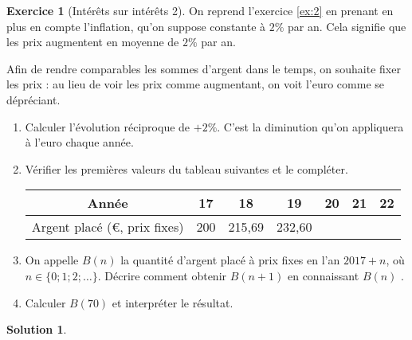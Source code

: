 \documentclass[12pt]{paper}
\theoremstyle{plain}
\newtheorem*{sol}{Solution}
\theoremstyle{definition}
\newtheorem{ex}{Exercice}
\newcommand{\exe}[2]{
		\begin{ex} #1  \end{ex}
		\begin{sol} #2 \end{sol}
	}
\newcommand{\exe}[2]{
		\begin{ex} #1  \end{ex}
	}
\begin{document}
 
 \exe{[Intérêts sur intérêts 2]
 
 	On reprend l'exercice \ref{ex:2} en prenant en plus en compte l'inflation, qu'on suppose constante à $2\%$ par an.
 	Cela signifie que les prix augmentent en moyenne de $2\%$ par an.
 	
 	Afin de rendre comparables les sommes d'argent dans le temps, on souhaite fixer les prix : au lieu de voir les prix comme augmentant, on voit l'euro comme se dépréciant.
 
	\begin{enumerate}
		\item Calculer l'évolution réciproque de $+2\%$. 
		C'est la diminution qu'on appliquera à l'euro chaque année.
		\item Vérifier les premières valeurs du tableau suivantes et le compléter.
			\begin{center}
			\begin{tabular}{|c|c|c|c|c|c|c|}\hline
				Année & 17 & 18 & 19 & 20 & 21 & 22 \\ \hline
				Argent placé (€, prix fixes) & 200 & 215,69 & 232,60 & & &  \\ \hline
			\end{tabular}
			\end{center}
		\item On appelle $B(n)$ la quantité d'argent placé à prix fixes en l'an $2017+n$, où $n\in \{0 ; 1 ; 2; \dots \}$.
		Décrire comment obtenir $B(n+1)$ en connaissant $B(n)$
		.%
		
		\item Calculer $B(70)$ et interpréter le résultat.
	\end{enumerate}
 }{}
\end{document}
